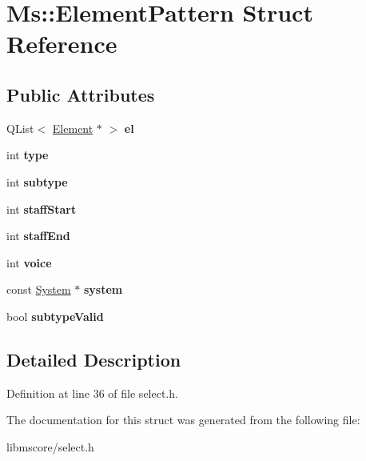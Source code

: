 \hypertarget{struct_ms_1_1_element_pattern}{}\section{Ms\+:\+:Element\+Pattern Struct Reference}
\label{struct_ms_1_1_element_pattern}
\subsection*{Public Attributes}
\begin{DoxyCompactItemize}
\item 
\mbox{\label{struct_ms_1_1_element_pattern_a1c28efd243d3e442f0fd58c16e3dc45d}} 
Q\+List$<$ \hyperlink{class_ms_1_1_element}{Element} $\ast$ $>$ {\bfseries el}
\item 
\mbox{\label{struct_ms_1_1_element_pattern_aee1e63f9ab01273577ae14fcc057e7e1}} 
int {\bfseries type}
\item 
\mbox{\label{struct_ms_1_1_element_pattern_abc3c1e11cbce9b04656de1da6379ce85}} 
int {\bfseries subtype}
\item 
\mbox{\label{struct_ms_1_1_element_pattern_acbad0df37a13e710b030df705f824b33}} 
int {\bfseries staff\+Start}
\item 
\mbox{\label{struct_ms_1_1_element_pattern_a6f517e6487f705bdc1ddeb407218a171}} 
int {\bfseries staff\+End}
\item 
\mbox{\label{struct_ms_1_1_element_pattern_a48612a4765a08bcb8fb36164e3ed9b2d}} 
int {\bfseries voice}
\item 
\mbox{\label{struct_ms_1_1_element_pattern_acdbfb285035b480376e4f5383d5a5677}} 
const \hyperlink{class_ms_1_1_system}{System} $\ast$ {\bfseries system}
\item 
\mbox{\label{struct_ms_1_1_element_pattern_a19164b1ee284dbe3f7f6b9a5eb594219}} 
bool {\bfseries subtype\+Valid}
\end{DoxyCompactItemize}


\subsection{Detailed Description}


Definition at line 36 of file select.\+h.



The documentation for this struct was generated from the following file\+:\begin{DoxyCompactItemize}
\item 
libmscore/select.\+h\end{DoxyCompactItemize}
